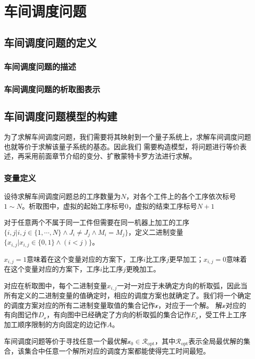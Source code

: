 \chapter{车间调度问题}\label{chap:JSP}
\section{车间调度问题的定义}
\subsection{车间调度问题的描述}
\subsection{车间调度问题的析取图表示}

\section{车间调度问题模型的构建}
为了求解车间调度问题，我们需要将其映射到一个量子系统上，求解车间调度问题也就等价于求解该量子系统的基态。因此我们
需要构造模型，将问题进行等价表述，再采用前面章节介绍的变分、扩散蒙特卡罗方法进行求解。

\subsection{变量定义}
设待求解车间调度问题总的工序数量为$N$，对各个工件上的各个工序依次标号$1\sim N$。析取图中，虚拟的起始工序标号$0$，虚拟的结束工序标号$N+1$

对于任意两个不属于同一工件但需要在同一机器上加工的工序$\{i,j|i,j\in \{1,\cdots,N\}\wedge J_i \neq J_j\wedge M_i=M_j\}$，定义二进制变量$\{x_{i,j}|x_{i,j} \in \{0,1\}\wedge (i<j)\}$。

$x_{i,j}=1$意味着在这个变量对应的方案下，工序$i$比工序$j$更早加工；$x_{i,j}=0$意味着在这个变量对应的方案下，工序$i$比工序$j$更晚加工。

对应在析取图中，每个二进制变量$x_{i,j}$一对一对应于未确定方向的析取弧，因此当所有定义的二进制变量的值确定时，相应的调度方案也就确定了。我们将一个确定的调度方案对应的所有二进制变量取值的集合记作$\mathcal{x}$，对应于一个解。
解$\mathcal{x}$对应的有向图记作$D_{\mathcal{x}}$，有向图中已经确定了方向的析取弧的集合记作$E_{\mathcal{x}}$，受工件上工序加工顺序限制的方向固定的边记作$A$。

车间调度问题等价于寻找任意一个最优解$\mathcal{x}_{0} \in \mathscr{R}_\text{opt}$，其中$\mathscr{R}_\text{opt}$表示全局最优解的集合，该集合中任意一个解所对应的调度方案都能使得完工时间最短。

